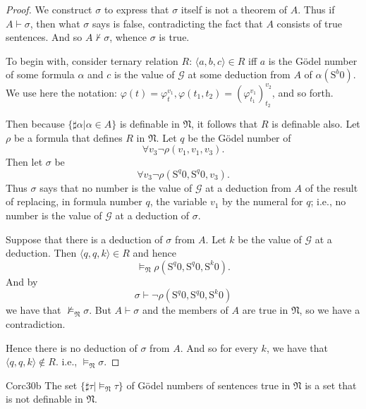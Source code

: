 \begin{proof}
  We construct $\sigma$ to express that $\sigma$ itself is not a theorem of $A$. Thus if $A\vdash \sigma$, then what $\sigma$ says is false, contradicting the fact that $A$ consists of true sentences. And so $A\not\vdash \sigma$, whence $\sigma$ is true.

  To begin with, consider ternary relation $R$: $\langle a,b,c\rangle\in R$ iff $a$ is the G\"odel number of some formula $\alpha$ and $c$ is the value of $\mathcal G$ at some deduction from $A$ of $\alpha(\mathrm{S}^b \mathrm{0}).$ We use here the notation: $\varphi(t)=\varphi_t^{v_1},\varphi(t_1,t_2)=(\varphi_{t_1}^{v_1})_{t_2}^{v_2}$, and so forth.

  Then because $\{\sharp \alpha|\alpha\in A\}$ is definable in $\mathfrak N$, it follows that $R$ is definable also. Let $\rho$ be a formula that defines $R$ in $\mathfrak N$. Let $q$ be the G\"odel number of
  \[
    \forall v_3\neg \rho(v_1,v_1,v_3).
  \]
  Then let $\sigma$ be
  \[
    \forall v_3\neg \rho(\mathrm{S}^q \mathrm{0},\mathrm{S}^q \mathrm{0},v_3).
  \]
  Thus $\sigma$ says that no number is the value of $\mathcal G$ at a deduction from $A$ of the result of replacing, in formula number $q$, the variable $v_1$ by the numeral for $q$; i.e., no number is the value of $\mathcal G$ at a deduction of $\sigma$.

  Suppose that there is a deduction of $\sigma$ from $A$. Let $k$ be the value of $\mathcal G$ at a deduction. Then $\langle q,q,k\rangle\in R$ and hence
  \[
    \vDash_{\mathfrak N}\rho(\mathrm{S}^q \mathrm{0},\mathrm{S}^q \mathrm{0},\mathrm{S}^k \mathrm{0}).
  \]
  And by
  \[
    \sigma\vdash\neg\rho(\mathrm{S}^q \mathrm{0},\mathrm{S}^q \mathrm{0},\mathrm{S}^k \mathrm{0})
  \]
  we have that $\not\vDash_{\mathfrak N}\sigma$. But $A\vdash \sigma$ and the members of $A$ are true in $\mathfrak N$, so we have a contradiction.

  Hence there is no deduction of $\sigma$ from $A$. And so for every $k$, we have that $\langle q,q,k\rangle\notin R$. i.e., $\vDash_{\mathfrak N}\sigma$.
\end{proof}


\begin{reference}{Cor}{c30b}
  The set $\{\sharp \tau|\vDash_{\mathfrak N}\tau\}$ of G\"odel numbers of sentences true in $\mathfrak N$ is a set that is not definable in $\mathfrak N$.
\end{reference}

